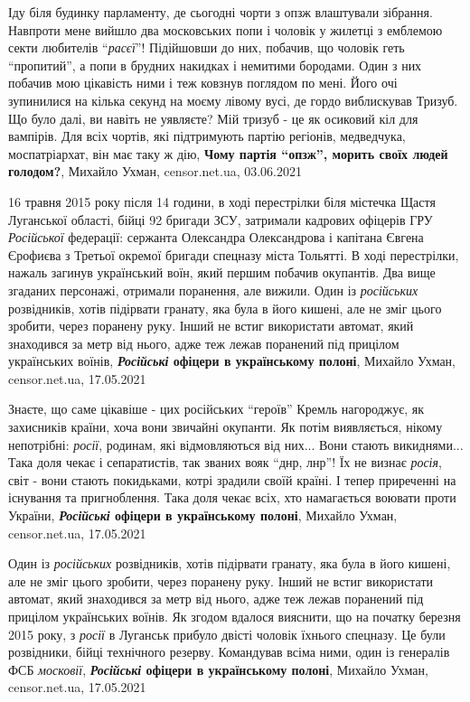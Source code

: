 Іду біля будинку парламенту, де сьогодні чорти з опзж влаштували зібрання.
Навпроти мене вийшло два московських попи і чоловік у жилетці з емблемою секти
любителів \enquote{\emph{расєї}}! Підійшовши до них, побачив, що чоловік геть \enquote{пропитий}, а
попи в брудних накидках і немитими бородами. Один з них побачив мою цікавість
ними і теж ковзнув поглядом по мені. Його очі зупинилися на кілька секунд на
моєму лівому вусі, де гордо виблискував Тризуб. Що було далі, ви навіть не
уявляєте? Мій тризуб - це як осиковий кіл для вампірів. Для всіх чортів, які
підтримують партію регіонів, медведчука, моспатріархат, він має таку ж дію,
\textbf{Чому партія \enquote{опзж}, морить своїх людей голодом?}, 
Михайло Ухман, censor.net.ua, 03.06.2021

16 травня 2015 року після 14 години, в ході перестрілки біля містечка Щастя
Луганської області, бійці 92 бригади ЗСУ, затримали кадрових офіцерів ГРУ
\emph{Російської} федерації: сержанта Олександра Олександрова і капітана Євгена
Єрофиєва з Третьої окремої бригади спецназу міста Тольятті.  В ході
перестрілки, нажаль загинув український воїн, який першим побачив окупантів.
Два вище згаданих персонажі, отримали поранення, але вижили. Один із
\emph{російських} розвідників, хотів підірвати гранату, яка була в його кишені,
але не зміг цього зробити, через поранену руку. Інший не встиг використати
автомат, який знаходився за метр від нього, адже теж лежав поранений під
прицілом українських воїнів,
\textbf{\emph{Російські} офіцери в українському полоні},
Михайло Ухман, censor.net.ua, 17.05.2021

Знаєте, що саме цікавіше - цих російських \enquote{героїв} Кремль нагороджує, як
захисників країни, хоча вони звичайні окупанти. Як потім виявляється, нікому
непотрібні: \emph{росії}, родинам, які відмовляються від них... Вони стають
викиднями...  Така доля чекає і сепаратистів, так званих вояк \enquote{днр, лнр}! Їх не
визнає \emph{росія}, світ - вони стають покидьками, котрі зрадили своїй країні. І
тепер приреченні на існування та пригноблення. Така доля чекає всіх, хто
намагається воювати проти України, 
\textbf{\emph{Російські} офіцери в українському полоні},
Михайло Ухман, censor.net.ua, 17.05.2021

Один із \emph{російських} розвідників, хотів підірвати гранату, яка була в його
кишені, але не зміг цього зробити, через поранену руку. Інший не встиг
використати автомат, який знаходився за метр від нього, адже теж лежав
поранений під прицілом українських воїнів.  Як згодом вдалося вияснити, що на
початку березня 2015 року, з \emph{росії} в Луганськ прибуло двісті чоловік
їхнього спецназу. Це були розвідники, бійці технічного резерву. Командував
всіма ними, один із генералів ФСБ \emph{московії},
\textbf{\emph{Російські} офіцери в українському полоні},
Михайло Ухман, censor.net.ua, 17.05.2021

